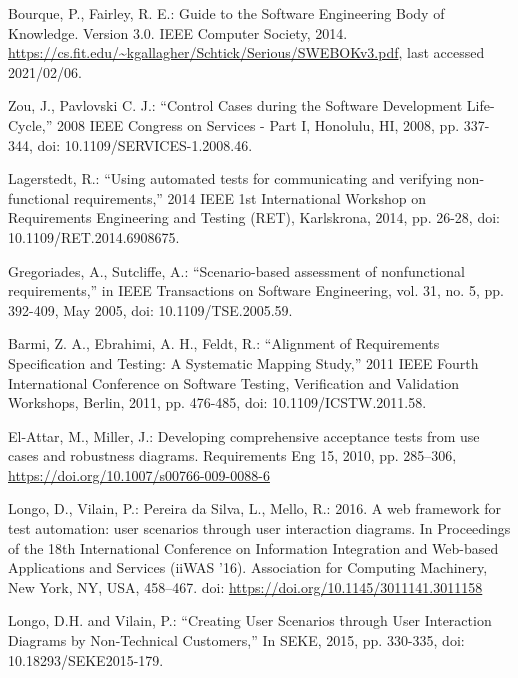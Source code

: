 \documentclass[a4paper,10pt, bibliography=totocnumbered]{scrreprt}
\begin{document}
\begin{thebibliography}{9}

 Bourque, P., Fairley, R. E.: Guide to the Software Engineering Body of Knowledge. Version 3.0.
IEEE Computer Society, 2014. \url{https://cs.fit.edu/~kgallagher/Schtick/Serious/SWEBOKv3.pdf}, last accessed 2021/02/06.

 Zou, J., Pavlovski C. J.: \enquote{Control Cases during the Software Development Life-Cycle,} 2008 IEEE Congress on Services - Part I, Honolulu, HI, 2008, pp. 337-344, doi: 10.1109/SERVICES-1.2008.46.

 Lagerstedt, R.: \enquote{Using automated tests for communicating and verifying non-functional requirements,} 2014 IEEE 1st International Workshop on Requirements Engineering and Testing (RET), Karlskrona, 2014, pp. 26-28, doi: 10.1109/RET.2014.6908675.

 Gregoriades, A., Sutcliffe, A.: \enquote{Scenario-based assessment of nonfunctional requirements,} in IEEE Transactions on Software Engineering, vol. 31, no. 5, pp. 392-409, May 2005, doi: 10.1109/TSE.2005.59.

 Barmi, Z. A., Ebrahimi, A. H., Feldt, R.: \enquote{Alignment of Requirements Specification and Testing: A Systematic Mapping Study,} 2011 IEEE Fourth International Conference on Software Testing, Verification and Validation Workshops, Berlin, 2011, pp. 476-485, doi: 10.1109/ICSTW.2011.58.

 El-Attar, M., Miller, J.: Developing comprehensive acceptance tests from use cases and robustness diagrams. Requirements Eng 15, 2010, pp. 285–306, \url{https://doi.org/10.1007/s00766-009-0088-6}

 Longo, D., Vilain, P.: Pereira da Silva, L., Mello, R.: 2016. A web framework for test automation: user scenarios through user interaction diagrams. In Proceedings of the 18th International Conference on Information Integration and Web-based Applications and Services (iiWAS '16). Association for Computing Machinery, New York, NY, USA, 458–467. doi: \url{https://doi.org/10.1145/3011141.3011158}

 Longo, D.H. and Vilain, P.: \enquote{Creating User Scenarios through User Interaction Diagrams by Non-Technical Customers,} In SEKE, 2015, pp. 330-335, doi: 10.18293/SEKE2015-179.


\end{thebibliography}
\end{document}
